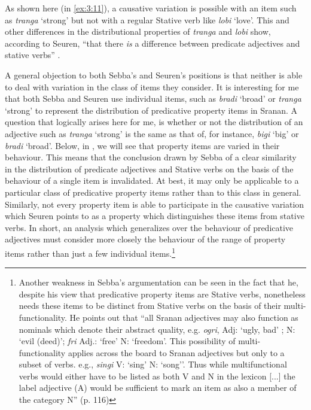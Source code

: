 \z \z


As shown here (in \ref{ex:3:11}), a causative variation is possible with an item such as
\textit{tranga} ‘strong’ but not with a regular Stative verb like
\textit{lobi} `love'.  This and other differences in the
distributional properties of \textit{tranga} and \textit{lobi} show,
according to Seuren, “that there \textit{is} a difference between
predicate adjectives and stative verbs” \citep[127]{Seuren1986}.

A general objection to both Sebba’s and Seuren’s positions is that
neither is able to deal with variation in the class of items they
consider.  It is interesting for me that both Sebba and Seuren use
individual items, such as \textit{bradi} `broad' or \textit{tranga} `strong' 
to represent the distribution of predicative property
items in Sranan.  A question that logically arises here for me, is
whether or not the distribution of an adjective such as \textit{tranga}
`strong' is the same as that of, for instance, \textit{bigi} `big'
or \textit{bradi} `broad'.  Below, in , we will see
that property items are varied in their behaviour.  This means that
the conclusion drawn by Sebba of a clear similarity in the
distribution of predicate adjectives and Stative verbs on the basis of
the behaviour of a single item is invalidated.  At best, it may only
be applicable to a particular class of predicative property items
rather than to this class in general.  Similarly, not every property
item is able to participate in the causative variation which Seuren
points to as a property which distinguishes these items from stative
verbs.  In short, an analysis which generalizes over the behaviour of
predicative adjectives must consider more closely the behaviour of the
range of property items rather than just a few individual
items.\footnote{Another weakness in Sebba’s argumentation can be seen
  in the fact that he, despite his view that predicative property
  items are Stative verbs, nonetheless needs these items to be
  distinct from Stative verbs on the basis of their
  multi-functionality. He points out that “all Sranan adjectives may
  also function as nominals which denote their abstract quality,
  e.g. \textit{ogri}, Adj: `ugly, bad' ; N: `evil (deed)';
  \textit{fri} Adj.: `free' N: `freedom'. This possibility of
  multi-functionality applies across the board to Sranan adjectives
  but only to a subset of verbs. e.g., \textit{singi} V: `sing' N:
  `song''. Thus while multifunctional verbs would either have to be
  listed as both V and N in the lexicon [...] the label adjective (A)
  would be sufficient to mark an item as also a member of the category
  N” (p. 116)}

